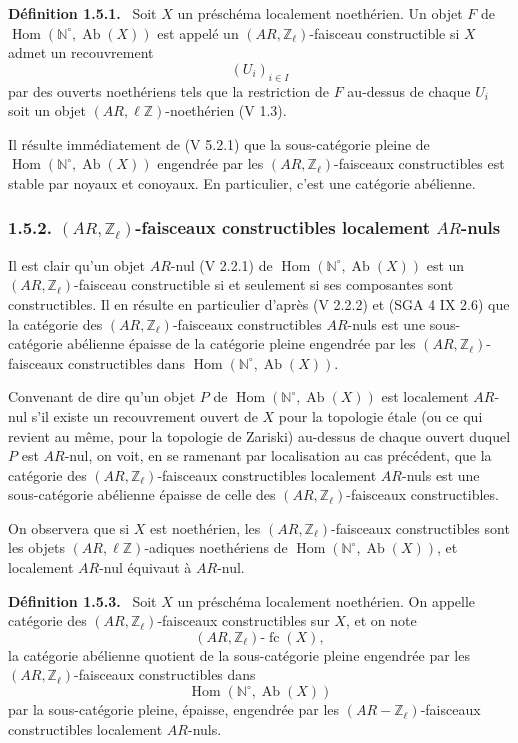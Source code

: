 \documentclass[11pt]{article}
\newenvironment{statement}[1]{\par\medskip\noindent\textbf{#1.}\ }{\par\medskip}
\DeclareMathOperator{\Hom}{Hom}
\providecommand{\Hom}{\operatorname{Hom}}
\providecommand{\Ab}{\operatorname{Ab}}
\providecommand{\fc}{\operatorname{fc}}
\providecommand{\Ab}{\operatorname{Ab}}
\begin{document}
\begin{statement}{Définition 1.5.1}
Soit \(X\) un préschéma localement noethérien. Un objet \(F\) de \(\Hom(\mathbb N^\circ,\Ab(X))\) est appelé un \((AR,\mathbb Z_\ell)\)-faisceau constructible si \(X\) admet un recouvrement
\[
(U_i)_{i\in I}
\]
par des ouverts noethériens tels que la restriction de \(F\) au-dessus de chaque \(U_i\) soit un objet \((AR,\ell\mathbb Z)\)-noethérien (V 1.3).
\end{statement}

Il résulte immédiatement de (V 5.2.1) que la sous-catégorie pleine de \(\Hom(\mathbb N^\circ,\Ab(X))\) engendrée par les \((AR,\mathbb Z_\ell)\)-faisceaux constructibles est stable par noyaux et conoyaux. En particulier, c'est une catégorie abélienne.

\subsubsection*{1.5.2. \((AR,\mathbb Z_\ell)\)-faisceaux constructibles localement \(AR\)-nuls}

Il est clair qu'un objet \(AR\)-nul (V 2.2.1) de \(\Hom(\mathbb N^\circ,\Ab(X))\) est un \((AR,\mathbb Z_\ell)\)-faisceau constructible si et seulement si ses composantes sont constructibles. Il en résulte en particulier d'après (V 2.2.2) et (SGA 4 IX 2.6) que la catégorie des \((AR,\mathbb Z_\ell)\)-faisceaux constructibles \(AR\)-nuls est une sous-catégorie abélienne épaisse de la catégorie pleine engendrée par les \((AR,\mathbb Z_\ell)\)-faisceaux constructibles dans \(\Hom(\mathbb N^\circ,\Ab(X))\).

Convenant de dire qu'un objet \(P\) de \(\Hom(\mathbb N^\circ,\Ab(X))\) est localement \(AR\)-nul s'il existe un recouvrement ouvert de \(X\) pour la topologie étale (ou ce qui revient au même, pour la topologie de Zariski) au-dessus de chaque ouvert duquel \(P\) est \(AR\)-nul, on voit, en se ramenant par localisation au cas précédent, que la catégorie des \((AR,\mathbb Z_\ell)\)-faisceaux constructibles localement \(AR\)-nuls est une sous-catégorie abélienne épaisse de celle des \((AR,\mathbb Z_\ell)\)-faisceaux constructibles.

On observera que si \(X\) est noethérien, les \((AR,\mathbb Z_\ell)\)-faisceaux constructibles sont les objets \((AR,\ell\mathbb Z)\)-adiques noethériens de \(\Hom(\mathbb N^\circ,\Ab(X))\), et localement \(AR\)-nul équivaut à \(AR\)-nul.

\begin{statement}{Définition 1.5.3}
Soit \(X\) un préschéma localement noethérien. On appelle catégorie des \((AR,\mathbb Z_\ell)\)-faisceaux constructibles sur \(X\), et on note
\[
(AR,\mathbb Z_\ell)\text{-}\fc(X),
\]
la catégorie abélienne quotient de la sous-catégorie pleine engendrée par les \((AR,\mathbb Z_\ell)\)-faisceaux constructibles dans
\[
\Hom(\mathbb N^\circ,\Ab(X))
\]
par la sous-catégorie pleine, épaisse, engendrée par les \((AR-\mathbb Z_\ell)\)-faisceaux constructibles localement \(AR\)-nuls.
\end{statement}
\end{document}
